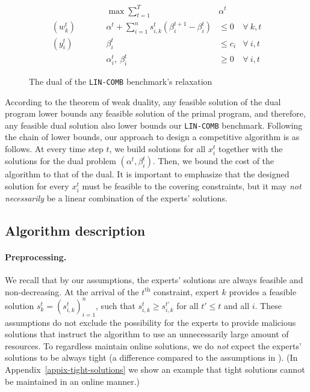 \begin{figure}[ht]
	\begin{mdframed}
		\begin{align*}
			&& \max \sum_{t=1}^{T} & \alpha^{t} \\
			(w_{k}^{t}) \qquad && \alpha^{t} + \sum_{i=1}^{n} s_{i,k}^{t} ( \beta_{i}^{t+1} - \beta_{i}^{t})   &\leq 0  &\forall\ k,t\\
			(y_{i}^{t}) \qquad && \beta_{i}^{t}   &\leq c_{i}  &\forall\ i,t \\
			&& \alpha_{i}^{t},\ \beta_{i}^{t} & \ge 0 & \forall\ i,t
		\end{align*}
	\end{mdframed}
	\caption{The dual of the \texttt{LIN-COMB} benchmark's relaxation}
	\label{fig:dual}
\end{figure}

\break

According to the theorem of weak duality, any feasible solution of the dual program lower bounds any feasible solution of the primal program, and therefore, any feasible dual solution also lower bounds our \texttt{LIN-COMB} benchmark. Following the chain of lower bounds, our approach to design a competitive algorithm is as follows. At every time step $t$, we build solutions for all $x_{i}^{t}$ together with the solutions for the dual problem $(\alpha^{t}, \beta_{i}^{t})$. Then, we bound the cost of the algorithm to that of the dual. It is important to emphasize that the designed solution for every $x_{i}^{t}$ must be feasible to the covering constraints, but it may \emph{not necessarily} be a linear combination of the experts' solutions.

\subsection{Algorithm description} \label{sec:algo}

\paragraph{Preprocessing.}
We recall that by our assumptions, the experts' solutions are always feasible and non-decreasing. At the arrival of the $t^{\text{th}}$ constraint, expert $k$ provides a feasible solution $s_{k}^{t} = (s_{i,k}^{t})_{i=1}^{n}$, such that $s_{i,k}^{t} \ge s_{i,k}^{t'}$ for all $t' \le t$ and all $i$. These assumptions do not exclude the possibility for the experts to provide malicious solutions that instruct the algorithm to use an unnecessarily large amount of resources.
To regardless maintain online solutions, we do \emph{not} expect the experts' solutions to be always tight (a difference compared to the assumptions in \cite{AnandGe22:Online-Algorithms}).
(In Appendix~\ref{appix-tight-solutions}
we show an example that tight solutions cannot be maintained in an online manner.)

